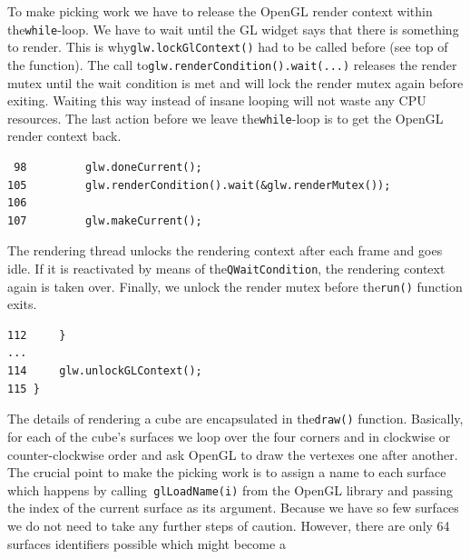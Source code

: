 \documentclass[prodmode,acmtopc]{acmsmall}
\begin{document}
To make picking work we have to release the OpenGL render context within
the\lstinline|while|-loop.
%
We have to wait until the GL widget says that there is something to render.
%
This is why\lstinline|glw.lockGlContext()| had to be called before (see top of
the function).
%
The call to\lstinline|glw.renderCondition().wait(...)| releases the render
mutex until the wait condition is met and will lock the render mutex again
before exiting.
%
Waiting this way instead of insane looping will not waste any CPU resources.
%
The last action before we leave the\lstinline|while|-loop is to get the OpenGL
render context back.
%
\begin{lstlisting}
 98         glw.doneCurrent();
105         glw.renderCondition().wait(&glw.renderMutex());
106
107         glw.makeCurrent();
\end{lstlisting}
%
%
The rendering thread unlocks the rendering context after each frame and goes
idle.
%
If it is reactivated by means of the\lstinline|QWaitCondition|, the rendering
context again is taken over.
%
Finally, we unlock the render mutex before the\lstinline|run()| function exits.
\begin{lstlisting}
112     }
...
114     glw.unlockGLContext();
115 }
\end{lstlisting}
%
The details of rendering a cube are encapsulated in the\lstinline|draw()|
function.
%
Basically, for each of the cube's surfaces we loop over the four corners and in
clockwise or counter-clockwise order and ask OpenGL to draw the vertexes one
after another.
%
The crucial point to make the picking work is to assign a name to each surface
which happens by calling\lstinline| glLoadName(i)| from the OpenGL library and
passing the index of the current surface as its argument.
%
Because we have so few surfaces we do not need to take any further steps of
caution.
%
However, there are only 64 surfaces identifiers possible which might become a
\end{document}
